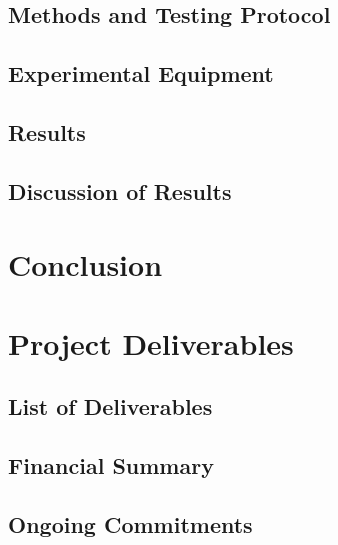 \documentclass[amsmath, amssymb, aps, pra, 12pt]{revtex4-1}
\begin{document}
\subsection{\label{sec:discussion:testing}Methods and Testing Protocol}


\subsection{\label{sec:discussion:equipment}Experimental Equipment}


\subsection{\label{sec:discussion:results}Results}


\subsection{\label{sec:discussion:resultdiscussion}Discussion of Results}



\section{\label{sec:conclusion}Conclusion}



\section{\label{sec:projectdeliverables}Project Deliverables}


\subsection{\label{sec:projectdeliverables:listofdeliverables}List of Deliverables}


\subsection{\label{sec:projectdeliverables:financialsummary}Financial Summary}


\subsection{\label{sec:projectdeliverables:ongoingcommitments}Ongoing Commitments}

\end{document}
